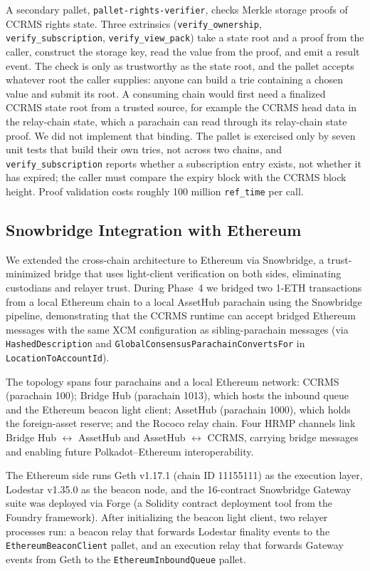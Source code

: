 A secondary pallet, \texttt{pallet-rights-verifier}, checks Merkle storage proofs of CCRMS rights state. Three extrinsics (\texttt{verify\_ownership}, \texttt{verify\_subscription}, \texttt{verify\_view\_pack}) take a state root and a proof from the caller, construct the storage key, read the value from the proof, and emit a result event. The check is only as trustworthy as the state root, and the pallet accepts whatever root the caller supplies: anyone can build a trie containing a chosen value and submit its root. A consuming chain would first need a finalized CCRMS state root from a trusted source, for example the CCRMS head data in the relay-chain state, which a parachain can read through its relay-chain state proof. We did not implement that binding. The pallet is exercised only by seven unit tests that build their own tries, not across two chains, and \texttt{verify\_subscription} reports whether a subscription entry exists, not whether it has expired; the caller must compare the expiry block with the CCRMS block height. Proof validation costs roughly 100 million \texttt{ref\_time} per call.

\subsection{Snowbridge Integration with Ethereum}\label{subsec:snowbridge}

We extended the cross-chain architecture to Ethereum via Snowbridge, a trust-minimized bridge that uses light-client verification on both sides, eliminating custodians and relayer trust. During Phase~4 we bridged two 1-ETH transactions from a local Ethereum chain to a local AssetHub parachain using the Snowbridge pipeline, demonstrating that the CCRMS runtime can accept bridged Ethereum messages with the same XCM configuration as sibling-parachain messages (via \texttt{HashedDescription} and \texttt{GlobalConsensusParachainConvertsFor} in \texttt{LocationToAccountId}).

The topology spans four parachains and a local Ethereum network: CCRMS (parachain 100); Bridge Hub (parachain 1013), which hosts the inbound queue and the Ethereum beacon light client; AssetHub (parachain 1000), which holds the foreign-asset reserve; and the Rococo relay chain. Four HRMP channels link Bridge Hub $\leftrightarrow$ AssetHub and AssetHub $\leftrightarrow$ CCRMS, carrying bridge messages and enabling future Polkadot--Ethereum interoperability.

The Ethereum side runs Geth v1.17.1 (chain ID 11155111) as the execution layer, Lodestar v1.35.0 as the beacon node, and the 16-contract Snowbridge Gateway suite was deployed via Forge (a Solidity contract deployment tool from the Foundry framework). After initializing the beacon light client, two relayer processes run: a beacon relay that forwards Lodestar finality events to the \texttt{EthereumBeaconClient} pallet, and an execution relay that forwards Gateway events from Geth to the \texttt{EthereumInboundQueue} pallet.

